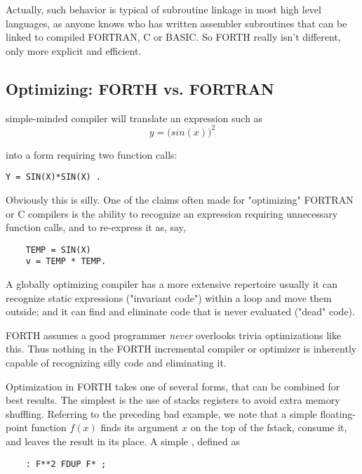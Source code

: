 Actually, such behavior is typical of subroutine linkage in most high
level languages, as anyone knows who has written assembler subroutines that can
be linked to compiled FORTRAN, C or BASIC.
So FORTH really isn't different, only more explicit and efficient.

\subsection{Optimizing: FORTH vs. FORTRAN}
 simple-minded compiler will translate an expression such as
\begin{equation}
     y=\Big( sin(x) \Big)^2\nonumber
\end{equation}

into a form requiring two function calls:

\begin{verbatim}
Y = SIN(X)*SIN(X) .
\end{verbatim}

Obviously this is silly. One of the claims often made for "optimizing" FORTRAN
or C compilers is the ability to recognize an
expression requiring unnecessary function calls, and to re-express
it as, say,
  
\begin{verbatim}
    TEMP = SIN(X)
    v = TEMP * TEMP.
\end{verbatim}

A globally optimizing compiler has a more extensive repertoire
usually it can recognize static expressions ("invariant code")
within a loop and move them outside; and it can find and eliminate code that is
never evaluated ("dead" code).

FORTH assumes a good programmer \textit{never} overlooks trivia
optimizations like this. Thus nothing in the FORTH incremental
compiler or optimizer is inherently capable of recognizing silly
code and eliminating it.

Optimization in FORTH takes one of several forms, that can be
combined for best results. The simplest is the use of stacks
registers to avoid extra memory shuffling. Referring to the
preceding bad example, we note that a simple floating-point
function $f(x)$ finds its argument $x$ on the top of the fstack, consume
it, and leaves the result in its place. A simple , defined as

\begin{verbatim}
    : F**2 FDUP F* ;
\end{verbatim}

